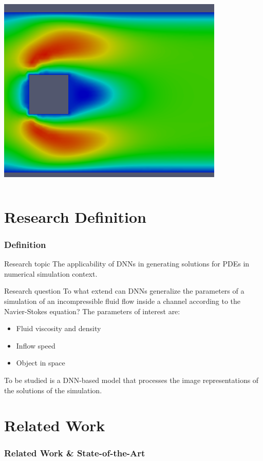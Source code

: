 \documentclass[18pt]{beamer}
\begin{document}
\begin{frame}
\begin{columns}
\begin{column}{0.5\textwidth}
\begin{center}
        \includegraphics[scale=0.3]{images/flow-4}
      \end{center}
    \end{column}
  \end{columns}
\end{frame}


\section{Research Definition}
\begin{frame}[t]
  \frametitle{Definition}
  \begin{block}{Research topic}
    The applicability of DNNs in generating solutions for PDEs in numerical simulation context.
  \end{block}
  \begin{block}{Research question}
    To what extend can DNNs generalize the parameters of a simulation of an incompressible fluid flow inside a channel according to the Navier-Stokes equation? The parameters of interest are:
    \begin{itemize}
    \item Fluid viscosity and density
    \item Inflow speed
    \item Object in space
    \end{itemize}
    To be studied is a DNN-based model that processes the image representations of the solutions of the simulation.
  \end{block}
\end{frame}


\section{Related Work}
\begin{frame}[t]
  \frametitle{Related Work \& State-of-the-Art}
  \begin{columns}[t]
    \begin{column}{0.5\textwidth}
    \end{column}
    \begin{column}{0.5\textwidth}
    \end{column}
  \end{columns}
\end{frame}
\end{document}
